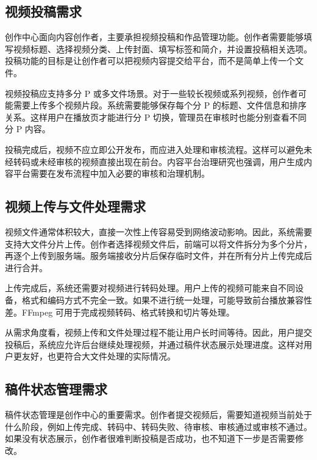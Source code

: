 \subsection{视频投稿需求}
\label{subsec:video-submit-requirements}

创作中心面向内容创作者，主要承担视频投稿和作品管理功能。创作者需要能够填写视频标题、选择视频分类、上传封面、填写标签和简介，并设置投稿相关选项。投稿功能的目标是让创作者可以把视频内容提交给平台，而不是简单上传一个文件。

视频投稿应支持多分 P 或多文件场景。对于一些较长视频或系列视频，创作者可能需要上传多个视频片段。系统需要能够保存每个分 P 的标题、文件信息和排序关系。这样用户在播放页才能进行分 P 切换，管理员在审核时也能分别查看不同分 P 内容。

投稿完成后，视频不应立即公开发布，而应进入处理和审核流程。这样可以避免未经转码或未经审核的视频直接出现在前台。内容平台治理研究也强调，用户生成内容平台需要在发布流程中加入必要的审核和治理机制\cite{gorwa2020algorithmic}。

\subsection{视频上传与文件处理需求}
\label{subsec:upload-file-processing-requirements}

视频文件通常体积较大，直接一次性上传容易受到网络波动影响。因此，系统需要支持大文件分片上传。创作者选择视频文件后，前端可以将文件拆分为多个分片，再逐个上传到服务端。服务端接收分片后保存临时文件，并在所有分片上传完成后进行合并。

上传完成后，系统还需要对视频进行转码处理。用户上传的视频可能来自不同设备，格式和编码方式不完全一致。如果不进行统一处理，可能导致前台播放兼容性差。FFmpeg 可用于完成视频转码、格式转换和切片等处理\cite{ffmpegdocs}。

从需求角度看，视频上传和文件处理过程不能让用户长时间等待。因此，用户提交投稿后，系统应允许后台继续处理视频，并通过稿件状态展示处理进度。这样对用户更友好，也更符合大文件处理的实际情况。

\subsection{稿件状态管理需求}
\label{subsec:post-status-requirements}

稿件状态管理是创作中心的重要需求。创作者提交视频后，需要知道视频当前处于什么阶段，例如上传完成、转码中、转码失败、待审核、审核通过或审核不通过。如果没有状态展示，创作者很难判断投稿是否成功，也不知道下一步是否需要修改。

